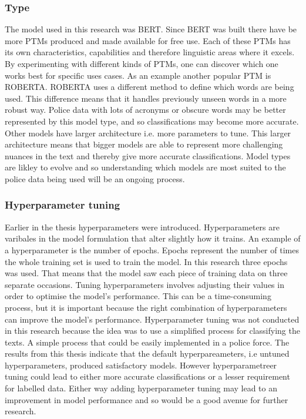 \subsubsection{Type} The model used in this research was BERT. Since BERT was built there have be more PTMs produced and made available for free use.  Each of these PTMs has its own characteristics, capabilities and therefore linguistic areas where it excels. By experimenting with different kinds of PTMs, one can discover which one works best for specific uses cases. As an example another popular PTM is ROBERTA. ROBERTA uses a different method to define which words are being used. This difference means  that  it handles previously unseen words in a more robust way. Police data with lots of acronyms or obscure words may be better represented by this model type, and so classifications may become more accurate. Other models have larger architecture i.e. more parameters to tune. This larger architecture means that bigger models are able to represent more challenging nuances in the text and thereby give more accurate classifications.  Model types are likley to evolve and so understanding which models are most suited to the police data being used will be an ongoing process.

\subsubsection{Hyperparameter tuning} Earlier in the thesis hyperparameters were introduced. Hyperparameters are varibales in the model formulation that alter slightly how it trains. An example of a hyperparameter is the number of epochs. Epochs represent the number of times the whole training set is used to train the model. In this research three epochs was used. That means that the model saw each piece of training data on three separate occasions. Tuning hyperparameters involves adjusting their values in order to optimise the model's performance. This can be a time-consuming process, but it is important because the right combination of hyperparameters can improve the model's performance. Hyperparameter tuning was not conducted in this research because the idea was to use a simplified process for classifying the texts. A simple process that could be easily implemented in a police force.  The results from this thesis indicate that the default hyperpareameters, i.e untuned hyperparameters, produced satisfactory models. However hyperparametreer tuning could lead to either more accurate classifications or  a lesser requirement for labelled data. Either way adding hyperparameter tuning may lead to an improvement in model performance and so would be a good avenue for further research. 

